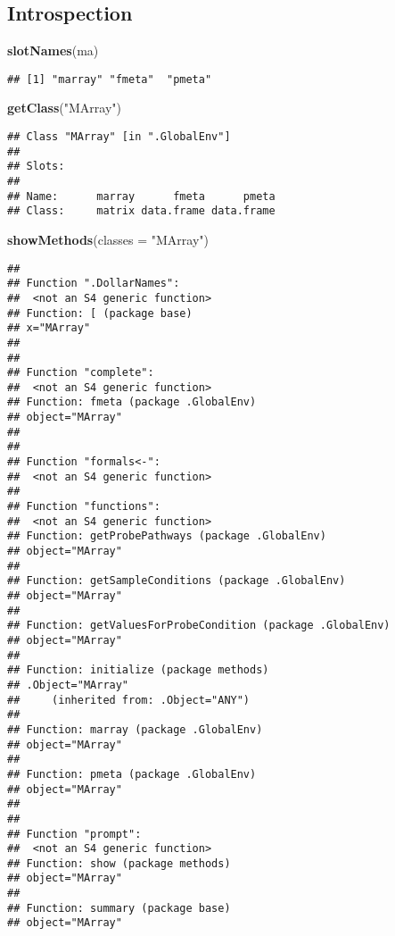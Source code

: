 \documentclass[]{article}
\newenvironment{Shaded}{\begin{snugshade}}{\end{snugshade}}
\newcommand{\DataTypeTok}[1]{\textcolor[rgb]{0.13,0.29,0.53}{#1}}
\newcommand{\KeywordTok}[1]{\textcolor[rgb]{0.13,0.29,0.53}{\textbf{#1}}}
\newcommand{\NormalTok}[1]{#1}
\newcommand{\StringTok}[1]{\textcolor[rgb]{0.31,0.60,0.02}{#1}}
\begin{document}
\hypertarget{introspection}{%
\subsection{Introspection}\label{introspection}}

\begin{Shaded}
\begin{Highlighting}[]
\KeywordTok{slotNames}\NormalTok{(ma)}
\end{Highlighting}
\end{Shaded}

\begin{verbatim}
## [1] "marray" "fmeta"  "pmeta"
\end{verbatim}

\begin{Shaded}
\begin{Highlighting}[]
\KeywordTok{getClass}\NormalTok{(}\StringTok{"MArray"}\NormalTok{)}
\end{Highlighting}
\end{Shaded}

\begin{verbatim}
## Class "MArray" [in ".GlobalEnv"]
## 
## Slots:
##                                        
## Name:      marray      fmeta      pmeta
## Class:     matrix data.frame data.frame
\end{verbatim}

\begin{Shaded}
\begin{Highlighting}[]
\KeywordTok{showMethods}\NormalTok{(}\DataTypeTok{classes =} \StringTok{"MArray"}\NormalTok{)}
\end{Highlighting}
\end{Shaded}

\begin{verbatim}
## 
## Function ".DollarNames":
##  <not an S4 generic function>
## Function: [ (package base)
## x="MArray"
## 
## 
## Function "complete":
##  <not an S4 generic function>
## Function: fmeta (package .GlobalEnv)
## object="MArray"
## 
## 
## Function "formals<-":
##  <not an S4 generic function>
## 
## Function "functions":
##  <not an S4 generic function>
## Function: getProbePathways (package .GlobalEnv)
## object="MArray"
## 
## Function: getSampleConditions (package .GlobalEnv)
## object="MArray"
## 
## Function: getValuesForProbeCondition (package .GlobalEnv)
## object="MArray"
## 
## Function: initialize (package methods)
## .Object="MArray"
##     (inherited from: .Object="ANY")
## 
## Function: marray (package .GlobalEnv)
## object="MArray"
## 
## Function: pmeta (package .GlobalEnv)
## object="MArray"
## 
## 
## Function "prompt":
##  <not an S4 generic function>
## Function: show (package methods)
## object="MArray"
## 
## Function: summary (package base)
## object="MArray"
\end{verbatim}
\end{document}
